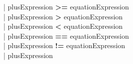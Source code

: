 \begin{tabbing}
                                                  \>| plusExpression \textbf{\textgreater{}=} equationExpression\\
                                                  \>| plusExpression \textbf{\textgreater{}} equationExpression\\
                                                  \>| plusExpression \textbf{\textless{}} equationExpression\\
                                                  \>| plusExpression \textbf{==} equationExpression\\
                                                  \>| plusExpression \textbf{!=} equationExpression\\
                                                  \>| plusExpression\\


\end{tabbing}
